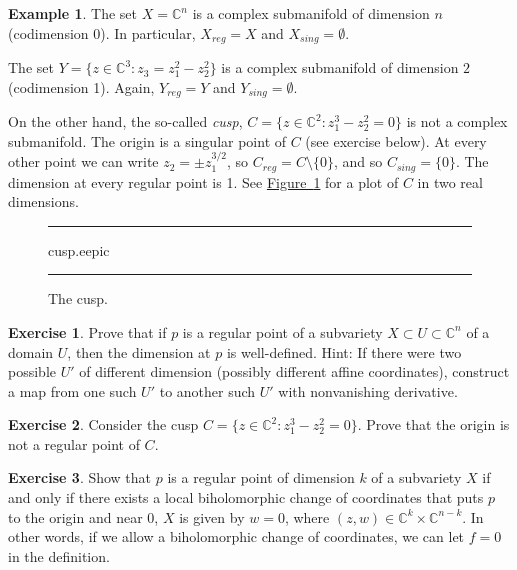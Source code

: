 \documentclass[12pt,openany]{book}
\newcommand{\C}{{\mathbb{C}}}
\newcommand{\myindex}[1]{#1\index{#1}}
\theoremstyle{plain}
\theoremstyle{remark}
\theoremstyle{definition}
\newenvironment{exbox}{%
    \def\FrameCommand{\vrule width 1pt \relax\hspace{10pt}}%
    \MakeFramed{\advance\hsize-\width\FrameRestore}%
}{%
    \endMakeFramed
}
\newenvironment{myfig}{%
\begin{figure}[h!t]
\noindent\rule{\textwidth}{0.5pt}\vspace{12pt}\par\centering}%
{\par\noindent\rule{\textwidth}{0.5pt}
\end{figure}}
\theoremstyle{exercise}
\newtheorem{exercise}{Exercise}[section]
\theoremstyle{example}
\newtheorem{example}[thm]{Example}
\newcommand{\figureref}[1]{\hyperref[#1]{Figure~\ref*{#1}}}
\begin{document}
\begin{example}
The set $X = \C^n$ is a complex submanifold of dimension $n$ (codimension 0).
In particular, $X_{\mathit{reg}} = X$ and $X_{\mathit{sing}} = \emptyset$.

The set $Y = \bigl\{ z \in \C^3 : z_3 = z_1^2 - z_2^2 \bigr\}$ is a complex submanifold of
dimension $2$ (codimension 1).  Again,
$Y_{\mathit{reg}} = Y$ and $Y_{\mathit{sing}} = \emptyset$.

On the other hand, the so-called \emph{\myindex{cusp}},
$C = \bigl\{ z \in \C^2 : z_1^3-z_2^2 = 0 \bigr\}$ is not a complex
submanifold.  The origin is a singular point of $C$
(see exercise below).
At every other point we can write $z_2 = \pm z_1^{3/2}$,
so $C_{\mathit{reg}} = C \setminus \{0\}$, and so $C_{\mathit{sing}} = \{ 0
\}$.
The dimension at every regular point is 1.
See \figureref{fig:cusp} for a 
plot of $C$ in two real dimensions.

\begin{myfig}
\medskip
{cusp.eepic}
\bigskip
\caption{The cusp.\label{fig:cusp}}
\end{myfig}
\end{example}


\begin{exbox}
\begin{exercise}
Prove that if $p$ is a regular point of a subvariety $X \subset U \subset
\C^n$ of a domain $U$, then the dimension at $p$ is well-defined.  Hint: If there were two possible
$U'$ of different dimension (possibly different affine coordinates), construct a map
from one such $U'$ to another such $U'$ with nonvanishing derivative.
\end{exercise}

\begin{exercise}
Consider the cusp 
$C = \bigl\{ z \in \C^2 : z_1^3-z_2^2 = 0 \bigr\}$.  Prove that
the origin is not a regular point of $C$.
\end{exercise}

\begin{exercise}
Show that $p$ is a regular point of dimension $k$ of a subvariety $X$
if and only if there
exists a local biholomorphic change of coordinates that puts $p$ to the
origin and near $0$, $X$ is given by $w=0$, where $(z,w) \in \C^{k} \times
\C^{n-k}$.  In other words, if we allow a biholomorphic change of
coordinates, we can let $f=0$ in the definition.
\end{exercise}
\end{exbox}
\end{document}
